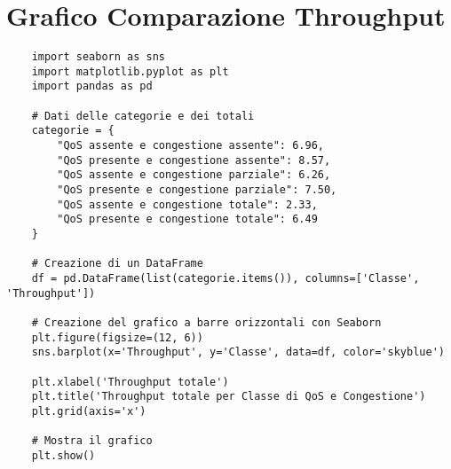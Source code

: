 \section{Grafico Comparazione Throughput}
\label{throughput_total_plot}
\begin{lstlisting}
    import seaborn as sns
    import matplotlib.pyplot as plt
    import pandas as pd
    
    # Dati delle categorie e dei totali
    categorie = {
        "QoS assente e congestione assente": 6.96,
        "QoS presente e congestione assente": 8.57,
        "QoS assente e congestione parziale": 6.26,
        "QoS presente e congestione parziale": 7.50,
        "QoS assente e congestione totale": 2.33,
        "QoS presente e congestione totale": 6.49
    }
    
    # Creazione di un DataFrame
    df = pd.DataFrame(list(categorie.items()), columns=['Classe', 'Throughput'])
    
    # Creazione del grafico a barre orizzontali con Seaborn
    plt.figure(figsize=(12, 6))
    sns.barplot(x='Throughput', y='Classe', data=df, color='skyblue')
    
    plt.xlabel('Throughput totale')
    plt.title('Throughput totale per Classe di QoS e Congestione')
    plt.grid(axis='x')
    
    # Mostra il grafico
    plt.show()
\end{lstlisting}